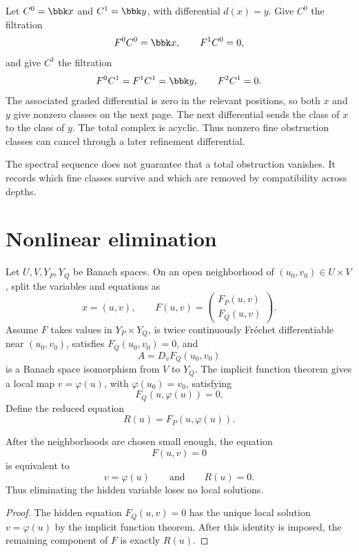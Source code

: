 \begin{example}\label{ex:spectral_cancellation}
Let $C^0=\bbk x$ and $C^1=\bbk y$, with differential $d(x)=y$.  Give $C^0$ the filtration
\[
F^0C^0=\bbk x,
\qquad
F^1C^0=0,
\]
and give $C^1$ the filtration
\[
F^0C^1=F^1C^1=\bbk y,
\qquad
F^2C^1=0.
\]
The associated graded differential is zero in the relevant positions, so both $x$ and $y$ give nonzero classes on the next page.  The next differential sends the class of $x$ to the class of $y$.  The total complex is acyclic.  Thus nonzero fine obstruction classes can cancel through a later refinement differential.
\end{example}

\begin{remark}\label{rem:spectral_sequence_meaning}
The spectral sequence does not guarantee that a total obstruction vanishes.  It records which fine classes survive and which are removed by compatibility across depths.
\end{remark}

\section{Nonlinear elimination}\label{sec:nonlinear_elimination}

Let $U,V,Y_P,Y_Q$ be Banach spaces. On an open neighborhood of $(u_0,v_0)\in U\times V$, split the variables and equations as
\[
x=(u,v),
\qquad
F(u,v)=
\begin{pmatrix}
F_P(u,v)\\
F_Q(u,v)
\end{pmatrix}.
\]
Assume $F$ takes values in $Y_P\times Y_Q$, is twice continuously Fr\'echet differentiable near $(u_0,v_0)$, satisfies $F_Q(u_0,v_0)=0$, and
\[
A=D_vF_Q(u_0,v_0)
\]
is a Banach space isomorphism from $V$ to $Y_Q$. The implicit function theorem gives a local map $v=\varphi(u)$, with $\varphi(u_0)=v_0$, satisfying
\[
F_Q(u,\varphi(u))=0.
\]
Define the reduced equation
\[
R(u)=F_P(u,\varphi(u)).
\]

\begin{theorem}\label{thm:exact_local_elimination}
After the neighborhoods are chosen small enough, the equation
\[
F(u,v)=0
\]
is equivalent to
\[
v=\varphi(u)
\qquad\text{and}\qquad
R(u)=0.
\]
Thus eliminating the hidden variable loses no local solutions.
\end{theorem}

\begin{proof}
The hidden equation $F_Q(u,v)=0$ has the unique local solution $v=\varphi(u)$ by the implicit function theorem.  After this identity is imposed, the remaining component of $F$ is exactly $R(u)$.
\end{proof}

